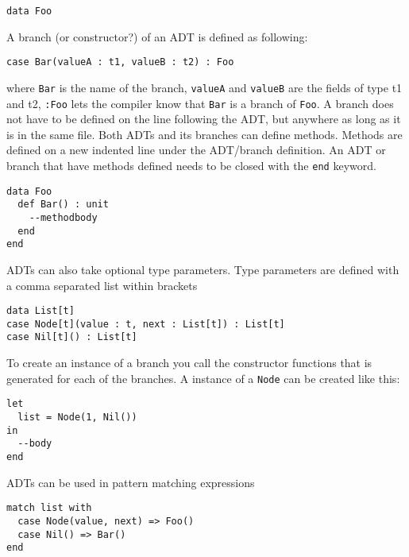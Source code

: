 \documentclass[10pt]{report}
\def\code#1{\texttt{#1}} %
\begin{document}
\begin{lstlisting}[language=Encore]
data Foo
\end{lstlisting}
A branch (or constructor?) of an ADT is defined as following:
\begin{lstlisting}[language=Encore]
case Bar(valueA : t1, valueB : t2) : Foo
\end{lstlisting}
\par{where \code{Bar} is the name of the branch, \code{valueA} and \code{valueB} are the fields of type t1 and t2, \code{:Foo} lets the compiler know that \code{Bar} is a branch of \code{Foo}.
A branch does not have to be defined on the line following the ADT, but anywhere as long as it is in the same file.
Both ADTs and its branches can define methods. Methods are defined on a new indented line under the ADT/branch definition.
An ADT or branch that have methods defined needs to be closed with the \code{end} keyword.}
\begin{lstlisting}[language=encore,caption={ADT definition with a method}]
data Foo
  def Bar() : unit
    --methodbody
  end
end
\end{lstlisting}
\par{ADTs can also take optional type parameters. Type parameters are defined with a comma separated list within brackets}
\begin{lstlisting}[language=encore,caption={Generic linked list implemented with an ADT}]
data List[t]
case Node[t](value : t, next : List[t]) : List[t]
case Nil[t]() : List[t]
\end{lstlisting}
\par{To create an instance of a branch you call the constructor functions that is generated for each of the branches.
A instance of a \code{Node} can be created like this:}
\begin{lstlisting}[language=encore,caption={Declaration of a list containing one element}]
let
  list = Node(1, Nil())
in
  --body
end
\end{lstlisting}
\par{ADTs can be used in pattern matching expressions}
\begin{lstlisting}[language=encore,caption={Pattern matching on a linked list}]
match list with
  case Node(value, next) => Foo()
  case Nil() => Bar()
end
\end{lstlisting}
\end{document}
